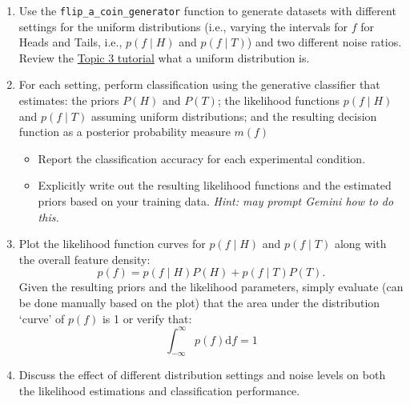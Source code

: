 \documentclass[12pt]{article}
\begin{document}
\begin{enumerate}[label=\alph*.]
    \item Use the \texttt{flip\_a\_coin\_generator} function to generate datasets with different settings for the uniform distributions (i.e., varying the intervals for \(f\) for Heads and Tails, i.e., $p(f\mid H)$ and $p(f\mid T)$) and two different noise ratios. Review the \href{https://umsystem.instructure.com/courses/280496/files/32565390?module_item_id=9779383}{Topic 3 tutorial} what a uniform distribution is. 
    \item For each setting, perform classification using the generative classifier that estimates: the priors \(P(H)\) and \(P(T)\); the likelihood functions \(p(f\mid H)\) and \(p(f\mid T)\) assuming uniform distributions; and the resulting decision function as a posterior probability measure $ m(f)$
    \begin{itemize}
    \item Report the classification accuracy for each experimental condition.
    \item Explicitly write out the resulting likelihood functions and the estimated priors based on your training data. \textit{Hint: may prompt Gemini how to do this.}
    \end{itemize}
    \item Plot the likelihood function curves for \(p(f\mid H)\) and \(p(f\mid T)\) along with the overall feature density:
    \[
    p(f) = p(f\mid H)P(H) + p(f\mid T)P(T).
    \]
    Given the resulting priors and the likelihood parameters, simply evaluate (can be done manually based on the plot) that the area under the distribution `curve' of $  p(f) $ is 1 or verify that:
    \[
    \int_{-\infty}^{\infty} p(f) \mathrm{d} f = 1
    \]
    \item Discuss the effect of different distribution settings and noise levels on both the likelihood estimations and classification performance.
\end{enumerate}
\end{document}
